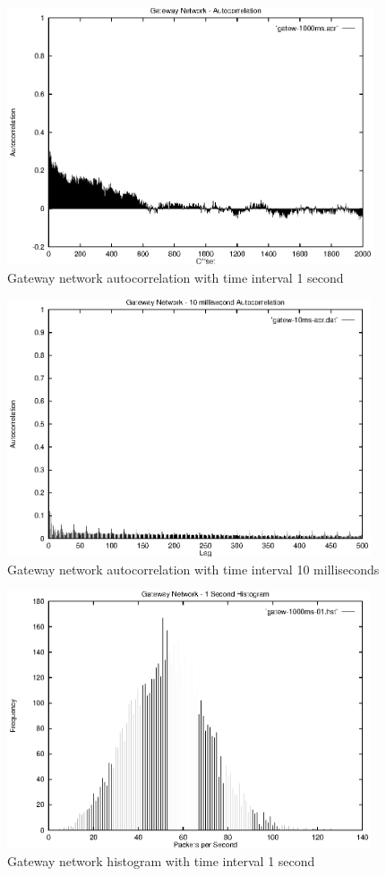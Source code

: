 \begin{figure}
\includegraphics[height=3in]{pics/gatew-1s-acr.eps}
\caption{Gateway network autocorrelation with time interval 1 second}
\label{results:gatew.1s.acr}
\end{figure}

\begin{figure}
\includegraphics[height=3in]{pics/gatew-10ms-acr.eps}
\caption{Gateway network autocorrelation with time interval 10 milliseconds}
\label{results:gatew.10ms.acr}
\end{figure}

\begin{figure}
\includegraphics[height=3in]{pics/gatew-1s-hist-01.eps}
\caption{Gateway network histogram with time interval 1 second}
\label{results:gatew.1s.hist}
\end{figure}

